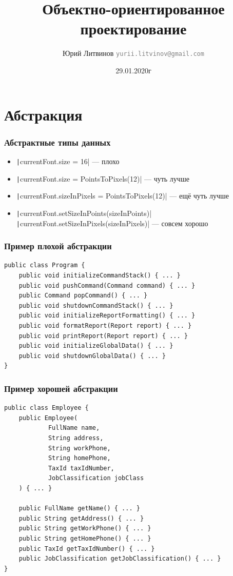 \documentclass[xetex,mathserif,serif]{beamer}
\title{Объектно-ориентированное проектирование}
\author[Юрий Литвинов]{Юрий Литвинов \newline \textcolor{gray}{\small\texttt{yurii.litvinov@gmail.com}}}
\date{29.01.2020г}
\begin{document}
	\frame{\titlepage}

	\section{Абстракция}

	\begin{frame}
		\frametitle{Абстрактные типы данных}
		\begin{itemize}
			\item \texttt|currentFont.size = 16| --- плохо
			\item \texttt|currentFont.size = PointsToPixels(12)| --- чуть лучше
			\item \texttt|currentFont.sizeInPixels = PointsToPixels(12)| --- ещё чуть лучше
			\item \texttt|currentFont.setSizeInPoints(sizeInPoints)| \newline
					\texttt|currentFont.setSizeInPixels(sizeInPixels)| --- совсем хорошо
		\end{itemize}
	\end{frame}

	\begin{frame}[fragile]
		\frametitle{Пример плохой абстракции}
		\begin{verbatim}
public class Program {
    public void initializeCommandStack() { ... }
    public void pushCommand(Command command) { ... }
    public Command popCommand() { ... }
    public void shutdownCommandStack() { ... }
    public void initializeReportFormatting() { ... }
    public void formatReport(Report report) { ... }
    public void printReport(Report report) { ... }
    public void initializeGlobalData() { ... }
    public void shutdownGlobalData() { ... }
}
		\end{verbatim}
	\end{frame}

	\begin{frame}[fragile]
		\frametitle{Пример хорошей абстракции}
		\begin{footnotesize}
			\begin{verbatim}
public class Employee {
    public Employee(
            FullName name,
            String address,
            String workPhone,
            String homePhone,
            TaxId taxIdNumber,
            JobClassification jobClass
    ) { ... }

    public FullName getName() { ... }
    public String getAddress() { ... }
    public String getWorkPhone() { ... }
    public String getHomePhone() { ... }
    public TaxId getTaxIdNumber() { ... }
    public JobClassification getJobClassification() { ... }
}
			\end{verbatim}
		\end{footnotesize}
	\end{frame}
\end{document}
